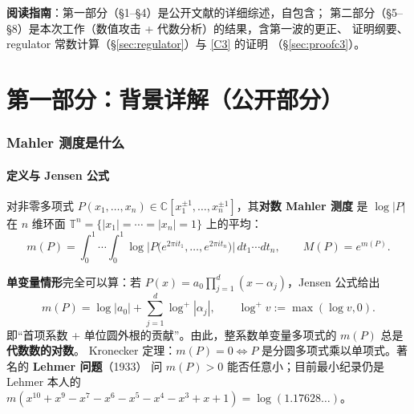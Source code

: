 \documentclass[11pt,a4paper]{ctexart}
\theoremstyle{remark}
\newcommand{\TT}{\mathbb{T}}
\newcommand{\CC}{\mathbb{C}}
\newcommand{\dd}{\,d}
\begin{document}
\begin{abstract}
逻辑链（Thm.~118 字典仅交叉验证）；\texttt{verify\_coinvariant.gp} 改中心格式
（实测阶 $p=2$），明确为数值核查。
(xiv) rev5（第五轮）：锚定证明的三处严格化——$F_{\mathrm{total}}=-2f_{11}$ 由无条件
成员性 $M_2(\Gamma_1(121))$（Brunault Lemma~11，level $N^2$）+ 精确 Sturm 计算到
$q^{2420}$（sharp 界 $1210$ 的两倍）证明；$\gamma^-$ 的本原性由 $\pm\Gamma_1(11)$
Manin 符号 Smith 正规形证明（整基坐标 $(1,-1)$）；常数 $C_x=-1$、$C_y=+1$ 与尖点表
\eqref{eq:mtable} 精确确定，辐角周期 $D_U=2\pi$、$D_V=0$ 精确（勘误：旧存档
``$D_U=D_V=0$''对 $U$ 不成立，修正项由 $\log|C_x|=\log|C_y|=0$ 精确消失）；新脚本
\texttt{siegel\_anchor\_step12/13/14}，\texttt{step10} 标注弃用。
(xv) rev6（第五轮报告，minor revision）：尖点标签换算改由 Brunault 定义直接证明
（Bézout：$\det\gamma=kd-11b=1$ ⟹ $d\equiv k^{-1}\bmod 11$，\eqref{eq:labelconv}）；
Bloch 段结尾中性化为归一化/格偏差（留作文献公开问题）；\texttt{step13} helper 修
Bézout 系数、\texttt{step14} 断言加强为 $D_U=1$（$2\pi$ 单位）。
\end{abstract}

\tableofcontents
\bigskip

\noindent\textbf{阅读指南}：第一部分（\S1--\S4）是公开文献的详细综述，自包含；
第二部分（\S5--\S8）是本次工作（数值攻击 + 代数分析）的结果，含第一波的更正、
证明纲要、regulator 常数计算（\S\ref{sec:regulator}）与 \eqref{C3} 的证明
（\S\ref{sec:proofc3}）。

\part*{第一部分：背景详解（公开部分）}

\section{Mahler 测度是什么}

\subsection{定义与 Jensen 公式}

对非零多项式 $P(x_1,\dots,x_n)\in\CC[x_1^{\pm1},\dots,x_n^{\pm1}]$，其\textbf{对数 Mahler 测度}
是 $\log|P|$ 在 $n$ 维环面 $\TT^n=\{|x_1|=\cdots=|x_n|=1\}$ 上的平均：
\[
m(P)=\int_0^1\!\!\cdots\!\int_0^1 \log\big|P\big(e^{2\pi i t_1},\dots,e^{2\pi i t_n}\big)\big|\dd t_1\cdots dt_n,
\qquad M(P)=e^{m(P)}.
\]

\textbf{单变量情形}完全可以算：若 $P(x)=a_0\prod_{j=1}^d(x-\alpha_j)$，Jensen 公式给出
\[
m(P)=\log|a_0|+\sum_{j=1}^d\log^+|\alpha_j|,\qquad \log^+v:=\max(\log v,0).
\]
即“首项系数 + 单位圆外根的贡献”。由此，整系数单变量多项式的 $m(P)$ 总是\textbf{代数数的对数}。
Kronecker 定理：$m(P)=0 \iff P$ 是分圆多项式乘以单项式。著名的 \textbf{Lehmer 问题}（1933）
问 $m(P)>0$ 能否任意小；目前最小纪录仍是 Lehmer 本人的
$m(x^{10}+x^9-x^7-x^6-x^5-x^4-x^3+x+1)=\log(1.17628\ldots)$。
\end{document}

